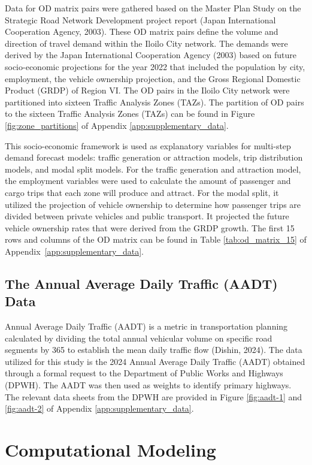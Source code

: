 Data for OD matrix pairs were gathered based on the Master Plan Study on the Strategic Road Network Development project report (Japan International Cooperation Agency, 2003). These OD matrix pairs define the volume and direction of travel demand within the Iloilo City network. The demands were derived by the Japan International Cooperation Agency (2003) based on future socio-economic projections for the year 2022 that included the population by city, employment, the vehicle ownership projection, and the Gross Regional Domestic Product (GRDP) of Region VI. The OD pairs in the Iloilo City network were partitioned into sixteen Traffic Analysis Zones (TAZs). The partition of OD pairs to the sixteen Traffic Analysis Zones (TAZs) can be found in Figure \ref{fig:zone_partitions} of Appendix \ref{app:supplementary_data}.

This socio-economic framework is used as explanatory variables for multi-step demand forecast models: traffic generation or attraction models, trip distribution models, and modal split models. For the traffic generation and attraction model, the employment variables were used to calculate the amount of passenger and cargo trips that each zone will produce and attract. For the modal split, it utilized the projection of vehicle ownership to determine how passenger trips are divided between private vehicles and public transport. It projected the future vehicle ownership rates that were derived from the GRDP growth. The  first 15 rows and columns of the OD matrix can be found in Table {\ref{tab:od_matrix_15}} of Appendix~\ref{app:supplementary_data}. 


\subsection{The Annual Average Daily Traffic (AADT) Data}
\label {sec:aadt}

Annual Average Daily Traffic (AADT) is a metric in transportation planning calculated by dividing the total annual vehicular volume on specific road segments by 365 to establish the mean daily traffic flow (Dishin, 2024). The data utilized for this study is the 2024 Annual Average Daily Traffic (AADT) obtained through a formal request to the Department of Public Works and Highways (DPWH). The AADT was then used as weights to identify primary highways. The relevant data sheets from the DPWH are provided in Figure \ref{fig:aadt-1} and \ref{fig:aadt-2} of Appendix \ref{app:supplementary_data}.

\section{Computational Modeling}
\label{sec:computational_modeling}

